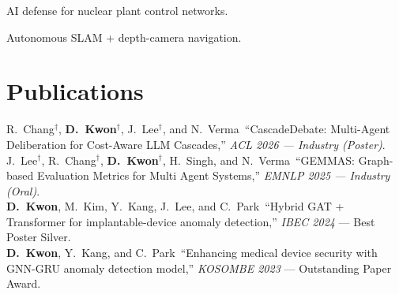 \documentclass[]{deedy-resume-openfont}
\begin{document}
\begin{minipage}[t]{0.66\textwidth}
 
AI defense for nuclear plant control networks.
\sectionsep

 
Autonomous SLAM + depth-camera navigation.
\sectionsep

\section{Publications}
R.~Chang$^{\dagger}$, \textbf{D.~Kwon}$^{\dagger}$, J.~Lee$^{\dagger}$, and N.~Verma\ ``CascadeDebate: Multi-Agent Deliberation for Cost-Aware LLM Cascades,'' \emph{ACL 2026 --- Industry (Poster)}.\\[0.15em]

J.~Lee$^{\dagger}$, R.~Chang$^{\dagger}$, \textbf{D.~Kwon}$^{\dagger}$, H.~Singh, and N.~Verma\ ``GEMMAS: Graph-based Evaluation Metrics for Multi Agent Systems,'' \emph{EMNLP 2025 --- Industry (Oral)}.\\[0.15em]

\textbf{D.~Kwon}, M.~Kim, Y.~Kang, J.~Lee, and C.~Park\ ``Hybrid GAT + Transformer for implantable-device anomaly detection,'' \emph{IBEC 2024} --- Best Poster Silver.\\[0.15em]

\textbf{D.~Kwon}, Y.~Kang, and C.~Park\ ``Enhancing medical device security with GNN-GRU anomaly detection model,'' \emph{KOSOMBE 2023} --- Outstanding Paper Award.
\end{minipage}
\end{document}
